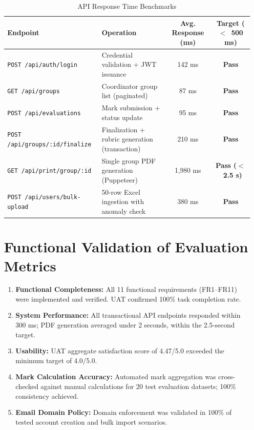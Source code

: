 \begin{table}[H]
\centering
\small
\caption{API Response Time Benchmarks}
\label{tab:perf_benchmarks}
\vspace{6pt}
\begin{tabularx}{\textwidth}{|l|X|c|c|}
\hline
\textbf{Endpoint} & \textbf{Operation} & \textbf{Avg. Response (ms)} & \textbf{Target ($<$~500 ms)} \\
\hline
\texttt{POST /api/auth/login} & Credential validation + JWT issuance & 142 ms & \textbf{Pass} \\
\texttt{GET /api/groups} & Coordinator group list (paginated) & 87 ms & \textbf{Pass} \\
\texttt{POST /api/evaluations} & Mark submission + status update & 95 ms & \textbf{Pass} \\
\texttt{POST /api/groups/:id/finalize} & Finalization + rubric generation (transaction) & 210 ms & \textbf{Pass} \\
\texttt{GET /api/print/group/:id} & Single group PDF generation (Puppeteer) & 1,980 ms & \textbf{Pass ($<$~2.5 s)} \\
\texttt{POST /api/users/bulk-upload} & 50-row Excel ingestion with anomaly check & 380 ms & \textbf{Pass} \\
\hline
\end{tabularx}
\end{table}

\section{Functional Validation of Evaluation Metrics}

\begin{enumerate}[label=\arabic*.]
    \item \textbf{Functional Completeness:} All 11 functional requirements (FR1--FR11) were implemented and verified. UAT confirmed 100\% task completion rate.
    \item \textbf{System Performance:} All transactional API endpoints responded within 300 ms; PDF generation averaged under 2 seconds, within the 2.5-second target.
    \item \textbf{Usability:} UAT aggregate satisfaction score of 4.47/5.0 exceeded the minimum target of 4.0/5.0.
    \item \textbf{Mark Calculation Accuracy:} Automated mark aggregation was cross-checked against manual calculations for 20 test evaluation datasets; 100\% consistency achieved.
    \item \textbf{Email Domain Policy:} Domain enforcement was validated in 100\% of tested account creation and bulk import scenarios.
\end{enumerate}

